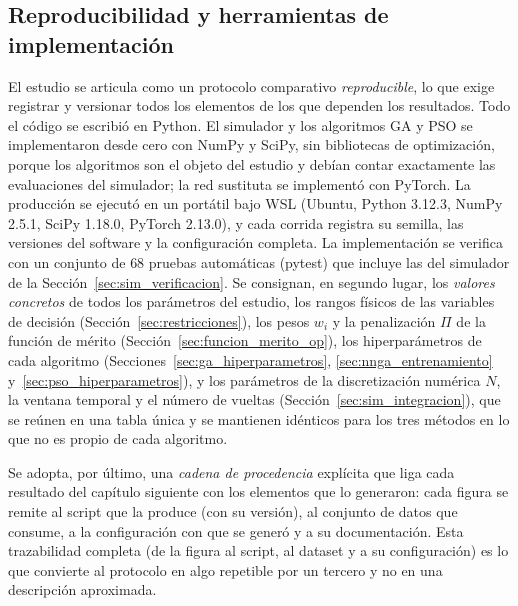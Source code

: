\subsection{Reproducibilidad y herramientas de implementación}
\label{sec:reproducibilidad}

El estudio se articula como un protocolo comparativo \emph{reproducible}, lo que
exige registrar y versionar todos los elementos de los que dependen los resultados.
Todo el código se escribió en Python. El simulador y los algoritmos GA y PSO se
implementaron desde cero con NumPy y SciPy, sin bibliotecas de optimización, porque
los algoritmos son el objeto del estudio y debían contar exactamente las evaluaciones
del simulador; la red sustituta se implementó con PyTorch. La producción se ejecutó en
un portátil bajo WSL (Ubuntu, Python 3.12.3, NumPy 2.5.1, SciPy 1.18.0, PyTorch 2.13.0),
y cada corrida registra su semilla, las versiones del software y la configuración
completa. La implementación se verifica con un conjunto de $68$ pruebas automáticas
(pytest) que incluye las del simulador de la Sección~\ref{sec:sim_verificacion}. Se consignan, en segundo
lugar, los \emph{valores concretos} de todos los parámetros del estudio, los rangos
físicos de las variables de decisión (Sección~\ref{sec:restricciones}), los pesos
$w_i$ y la penalización $\Pi$ de la función de mérito
(Sección~\ref{sec:funcion_merito_op}), los hiperparámetros de cada algoritmo
(Secciones~\ref{sec:ga_hiperparametros}, \ref{sec:nnga_entrenamiento}
y~\ref{sec:pso_hiperparametros}), y los parámetros de la discretización numérica
$N$, la ventana temporal y el número de vueltas (Sección~\ref{sec:sim_integracion}),
que se reúnen en una tabla única y se mantienen idénticos para los tres métodos en lo
que no es propio de cada algoritmo.



Se adopta, por último, una \emph{cadena de procedencia} explícita que liga cada
resultado del capítulo siguiente con los elementos que lo generaron: cada figura se
remite al script que la produce (con su versión), al conjunto de datos que consume,
a la configuración con que se generó y a su documentación. Esta trazabilidad
completa (de la figura al script, al dataset y a su configuración) es lo que
convierte al protocolo en algo repetible por un tercero y no en una descripción
aproximada.

